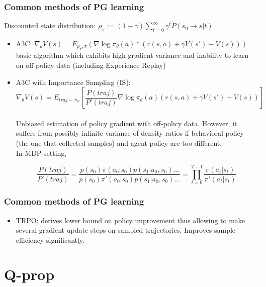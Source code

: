 \documentclass{beamer}
\begin{document}
\begin{frame}[t]
\frametitle{Common methods of PG learning}

Discounted state distribution: $\rho_\pi :=  (1-\gamma) \sum_{t=0}^\infty \gamma^t P(s_0 \rightarrow s | t)$ 

\begin{itemize}

\item A3C: $\nabla_\theta V(s) = E_{\rho_\pi, \pi}(\nabla \log \pi_\theta (a) * (r(s,a) + \gamma V(s') - V(s)))$ 
\\basic algorithm which exhibits high gradient variance and inability to learn on off-policy data (including Experience Replay)

\item A3C with Importance Sampling (IS): \[ \nabla_\theta V(s) = E_{traj \sim \pi_{\theta'}} \left[ \dfrac{P(traj)}{P'(traj)} \nabla \log \pi_\theta (a) (r(s,a) + \gamma V(s') - V(s)) \right] \]
\\Unbiased estimation of policy gradient with off-policy data. However, it suffers from possibly infinite variance of density ratios if behavioral policy (the one that collected samples) and agent policy are too different.
\\In MDP setting, 

\begin{equation}
\dfrac{P(traj)}{P'(traj)} = \dfrac{p(s_0) \pi (a_0 | s_0) p(s_1 | a_0, s_0)
...} {p(s_0) \pi' (a_0 | s_0) p(s_1 | a_0, s_0)
...} = \prod_{t=0}^{T-1} \dfrac{\pi (a_t | s_t)} {\pi' (a_t | s_t)}
\end{equation}

\end{itemize}
\end{frame}

\begin{frame}[t]
\frametitle{Common methods of PG learning}
\begin{itemize}

\item TRPO: derives lower bound on policy improvement thus allowing to make several gradient update steps on sampled trajectories. Improves sample efficiency significantly.

\end{itemize}
\end{frame}

\section{Q-prop}
\end{document}
